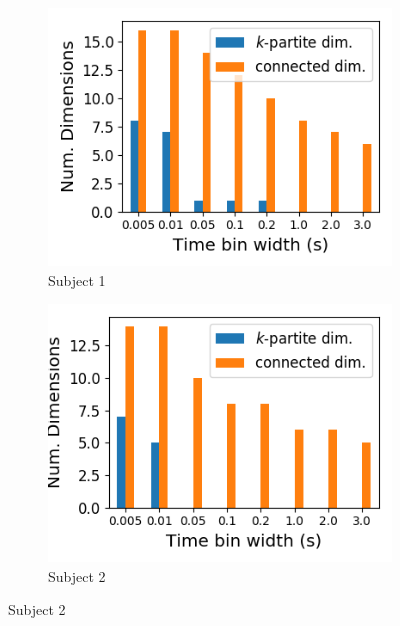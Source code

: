   \begin{figure}[p]
    \begin{subfigure}[h]{0.5\linewidth}
      \centering
      \includegraphics[width=\linewidth]{figures/eight_probe/Krebs_rectified_total_structure_dims.png}
      \caption{Subject 1}
      \label{fig:Krebs_rectified_total_structure_dims}
    \end{subfigure}
    \begin{subfigure}[h]{0.5\linewidth}
      \centering
      \includegraphics[width=\linewidth]{figures/eight_probe/Waksman_rectified_total_structure_dims.png}
      \caption{Subject 2}
      \label{fig:Waksman_rectified_total_structure_dims}
    \end{subfigure}

\end{figure}
